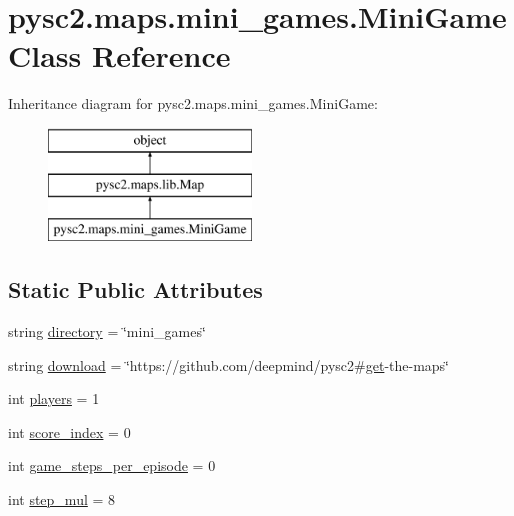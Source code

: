 \hypertarget{classpysc2_1_1maps_1_1mini__games_1_1_mini_game}{}\section{pysc2.\+maps.\+mini\+\_\+games.\+Mini\+Game Class Reference}
\label{classpysc2_1_1maps_1_1mini__games_1_1_mini_game}
Inheritance diagram for pysc2.\+maps.\+mini\+\_\+games.\+Mini\+Game\+:\begin{figure}[H]
\begin{center}
\leavevmode
\includegraphics[height=3.000000cm]{classpysc2_1_1maps_1_1mini__games_1_1_mini_game}
\end{center}
\end{figure}
\subsection*{Static Public Attributes}
\begin{DoxyCompactItemize}
\item 
string \mbox{\hyperlink{classpysc2_1_1maps_1_1mini__games_1_1_mini_game_ad4787d16362840b59df8ab24cc4c1ef6}{directory}} = \char`\"{}mini\+\_\+games\char`\"{}
\item 
string \mbox{\hyperlink{classpysc2_1_1maps_1_1mini__games_1_1_mini_game_ab76b62f8285a6e6df13c851b07244ec7}{download}} = \char`\"{}https\+://github.\+com/deepmind/pysc2\#\mbox{\hyperlink{namespacepysc2_1_1maps_a7339e6c1eb478b31383819b34c166f9d}{get}}-\/the-\/maps\char`\"{}
\item 
int \mbox{\hyperlink{classpysc2_1_1maps_1_1mini__games_1_1_mini_game_a048be4a1c9a84bc2840b02803b0e9bba}{players}} = 1
\item 
int \mbox{\hyperlink{classpysc2_1_1maps_1_1mini__games_1_1_mini_game_a3c0c3e70ab74df2db8936a587058d641}{score\+\_\+index}} = 0
\item 
int \mbox{\hyperlink{classpysc2_1_1maps_1_1mini__games_1_1_mini_game_a05115bbebd6b28e355b240137dba77c6}{game\+\_\+steps\+\_\+per\+\_\+episode}} = 0
\item 
int \mbox{\hyperlink{classpysc2_1_1maps_1_1mini__games_1_1_mini_game_a07c09b8eaefe6f1c486f85a3ec6acf36}{step\+\_\+mul}} = 8
\end{DoxyCompactItemize}
